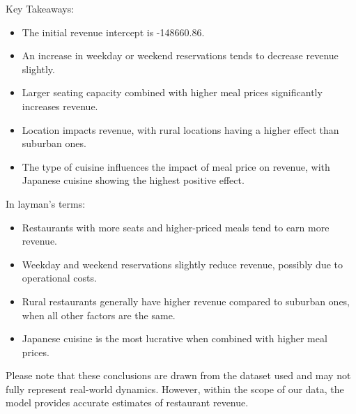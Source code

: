 Key Takeaways:

\begin{itemize}
    \item The initial revenue intercept is -148660.86.
    \item An increase in weekday or weekend reservations tends to decrease revenue slightly.
    \item Larger seating capacity combined with higher meal prices significantly increases revenue.
    \item Location impacts revenue, with rural locations having a higher effect than suburban ones.
    \item The type of cuisine influences the impact of meal price on revenue, with Japanese cuisine showing the highest positive effect.
\end{itemize}

In layman's terms:

\begin{itemize}
    \item Restaurants with more seats and higher-priced meals tend to earn more revenue.
    \item Weekday and weekend reservations slightly reduce revenue, possibly due to operational costs.
    \item Rural restaurants generally have higher revenue compared to suburban ones, when all other factors are the same.
    \item Japanese cuisine is the most lucrative when combined with higher meal prices.
\end{itemize}

Please note that these conclusions are drawn from the dataset used and may not fully represent real-world dynamics. However, within the scope of our data, the model provides accurate estimates of restaurant revenue.
